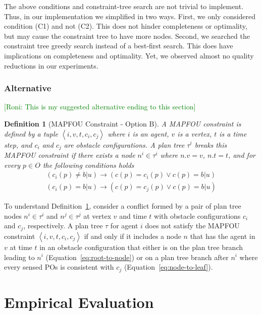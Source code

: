 \documentclass[letterpaper]{article} %
\newcommand{\unknown}{\textit{b}|\textit{u}}
\newcommand{\pos}{POs\xspace}
\newcommand{\tuple}[1]{\ensuremath{\left \langle #1 \right \rangle }}
\newcommand{\roni}[1]{{\textcolor{green}{[Roni: #1]}}}
\newtheorem{definition}{Definition}
\begin{document}
The above conditions and constraint-tree search are not trivial to implement. Thus, in our implementation we simplified in two ways. 
First, we only considered condition (C1) and not (C2). This does not hinder completeness or optimality, but may cause the constraint tree to have more nodes. 
Second, we searched the constraint tree greedy search instead of a best-first search. This does have implications on completeness and optimality. Yet, we observed almost no quality reductions in our experiments. 



\subsubsection{Alternative} 
\roni{This is my suggested alternative ending to this section} 


\begin{definition}[MAPFOU Constraint - Option B]
A MAPFOU constraint is defined by a tuple $\tuple{i,v,t,c_i,c_j}$ 
where $i$ is an agent, 
$v$ is a vertex,
$t$ is a time step, 
and $c_i$ and $c_j$ are obstacle configurations. 
A plan tree $\tau^i$ breaks this MAPFOU constraint if there exists a node $n^i\in\tau^i$ where $n.v=v$,  $n.t=t$, and for every $p\in O$ the following conditions holds 
\begin{eqnarray}
\left(c_i(p)\neq\unknown\right)\rightarrow \left(c(p)=c_i(p)\vee c(p)=\unknown\right) \label{eq:root-to-node}
\\
\left(c_i(p)=\unknown\right)\rightarrow \left(c(p)=c_j(p)\vee c(p)=\unknown\right)  \label{eq:node-to-leaf}
\end{eqnarray}
\label{def:mapfou-constraint}
\end{definition}
To understand Definition~\ref{def:mapfou-constraint}, consider a conflict formed by a pair of plan tree nodes
$n^i\in\tau^i$ and $n^j\in\tau^j$ at vertex $v$ and time $t$ with obstacle configurations $c_i$ and $c_j$, respectively. A plan tree $\tau$ for agent $i$ does not satisfy the MAPFOU constraint $\tuple{i,v,t,c_i,c_j}$ if and only if it includes a node $n$ that has the agent in $v$ at time $t$ in 
an obstacle configuration that either is on the plan tree branch leading to $n^i$ (Equation~\ref{eq:root-to-node}) 
or on a plan tree branch after $n^i$ where every sensed \pos is consistent with $c_j$ (Equation~\ref{eq:node-to-leaf}).



\section{Empirical Evaluation}
\end{document}
